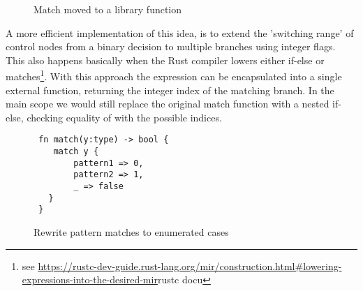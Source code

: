 \begin{figure}[H]
\centering
\tabskip=0pt
\caption{Match moved to a library function}
\label{fig:MatchHandling}
\end{figure}

 A more efficient implementation of this idea, is to extend the 'switching range' of control nodes from a binary decision to multiple branches using integer flags. This also happens basically when the Rust compiler lowers either if-else or matches\footnote{see \url{https://rustc-dev-guide.rust-lang.org/mir/construction.html\#lowering-expressions-into-the-desired-mir}{rustc docu}}. With this approach the  expression can be encapsulated into a single external function, returning the integer index of the matching branch. In the main scope we would still replace the original match function with a nested if-else, checking equality of  with the possible indices.  
 
\begin{figure}[H]
\centering
\begin{verbatim}
 fn match(y:type) -> bool {
    match y {
        pattern1 => 0,
        pattern2 => 1,
        _ => false
   }        
 }  
\end{verbatim}
\caption{Rewrite pattern matches to enumerated cases}
\label{fig:MatchHandling2}
\end{figure}
\bigskip


